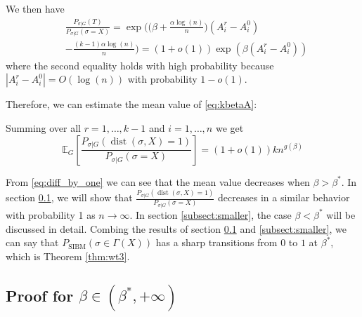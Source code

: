 \label{key}\documentclass[conference]{IEEEtran}
\DeclareMathOperator{\SIBM}{SIBM}
\DeclareMathOperator{\dist}{dist}
\begin{document}
We then have
\begin{align}
&\frac{P_{\sigma|G}(T)}
{P_{\sigma|G}(\sigma=X)}
= \exp\Big(\big(\beta+\frac{\alpha\log(n)}{n} \big) (A^r_i-A^0_i) \nonumber\\
&-\frac{(k-1)\alpha\log(n)}{n} \Big) 
= (1+o(1)) \exp ( \beta(A^r_i-A^0_i)) \label{eq:kbetaA}
\end{align}
where the second equality holds with high probability because $|A^r_i-A^0_i|=O(\log(n))$ with probability $1-o(1)$.

Therefore, we can estimate the mean value of \eqref{eq:kbetaA}:


Summing over all $r=1, \dots, k-1$ and $i=1, \dots, n$ we get
\begin{equation}\label{eq:diff_by_one}
\mathbb{E}_G[\frac{P_{\sigma|G}(\dist(\sigma, X)=1)}
{P_{\sigma|G}(\sigma=X)}] = (1+o(1))k n^{g(\beta)}
\end{equation}


From \eqref{eq:diff_by_one} we can see that the mean value decreases when $\beta > \beta^*$. In section \ref{beta_large}, we will show that $\frac{P_{\sigma|G}(\dist(\sigma, X)=1)}{P_{\sigma|G}(\sigma=X)}$ decreases
in a similar behavior with probability 1 as $n\to \infty$.
In section \ref{subsect:smaller}, the case $\beta < \beta^*$ will be discussed in detail.
Combing the results of section \ref{beta_large} and \ref{subsect:smaller}, we can say that
$P_{\SIBM}(\sigma\in \Gamma(X))$ has a sharp transitions from $0$ to $1$ at $\beta^\ast$,
which is Theorem \ref{thm:wt3}.
\subsection{Proof for $\beta\in(\beta^*,+\infty)$}\label{beta_large}
\end{document}

